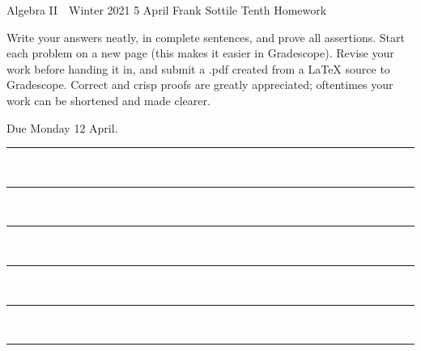\documentclass[12pt]{article}
\newcommand{\barsl}{\noindent\begin{minipage}[t]{575pt}
{\color{violet}\rule{575pt}{1.2pt}}\vspace{-5.7mm}\\
{\color{blue}\rule{575pt}{1.2pt}}\vspace{-5.7mm}\\
{\color{green}\rule{575pt}{1.2pt}}\vspace{-5.7mm}\\
{\color{yellow}\rule{575pt}{1.2pt}}\vspace{-5.7mm}\\
{\color{orange}\rule{575pt}{1.2pt}}\vspace{-5.7mm}\\
{\color{red}\rule{575pt}{1.2pt}}
\end{minipage}}
\begin{document}
\LARGE 
\noindent
Algebra II\ \ Winter 2021 \hfill 5 April\makebox[40pt][l]{\ }\newline
Frank Sottile \hfill
\Large\sf
Tenth Homework\makebox[40pt][l]{\ }
\vspace{5pt}
\normalsize

\noindent
Write your answers neatly, in complete sentences, and prove all assertions.
Start each problem on a new page (this makes it easier in Gradescope).
Revise your work before handing it in, and submit a .pdf  created from a LaTeX source to Gradescope.
Correct and crisp proofs are greatly appreciated; oftentimes your work can be shortened and made clearer.

\noindent
{\color{red}Due Monday 12 April.}\vspace{1pt}

\barsl
\end{document}
